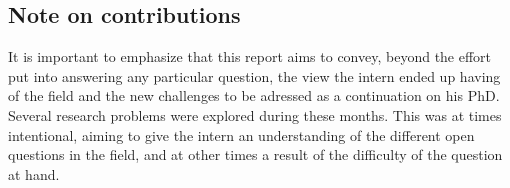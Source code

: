 \documentclass[../../main.tex]{subfiles} %
\begin{document}
\begin{comment}
	The mean-field approximation probabilistic approach and the graph Laplacian 
	spectral clustering were developed independently and had no known 
	connection. 
	In the former, one deals with a key object called the evidence lower bound 
	(ELBO). The question posed by the advisors at the beginning of 
	this internship was: \marginnote{\todo{Put this on the conclusion and focus 
	on 
			the 
			real problem. Then you explain why you did not have time due to 
			other things.}}
	
	\begin{center}
		\textit{Is it possible to somehow simplify the expression for the ELBO 
		in 
			Equation \eqref{eq:phi} in terms of the graph Laplacian, thus 
			linking the 
			probabilistic and spectral approaches ?}
	\end{center}
	
	Such a connection would have consequences of interest. For example, one 
	could be able to extend the probabilistic model selection procedure to the 
	spectral methods, giving them a principled way of picking the number of 
	clusters with which to run the k-means algorithm. Another example of 
	application of this connection would be the development of a ``spectral'' 
	notion of robustness. \marginnote{\todo{Write how k-means and EM match in 
	the 
			anisotropic case.}}
\end{comment}

\subsection{Note on contributions}
It is important to emphasize that this report aims to convey, beyond the effort 
put into answering any particular question, the view the intern ended up having 
of the field and the new challenges to be adressed as a continuation on his 
PhD. Several research problems were explored during these months. This was at 
times intentional, aiming to give the intern an understanding of the different 
open questions in the field, and at other times a result of the difficulty of 
the question at hand.
\end{document}

